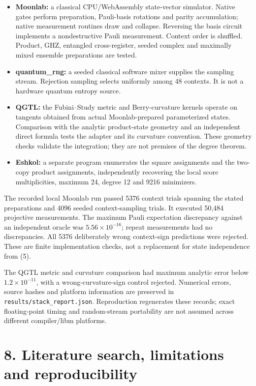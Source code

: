 \documentclass[10pt,a4paper]{article}
\providecommand{\tightlist}{\setlength{\itemsep}{0pt}\setlength{\parskip}{0pt}}
\begin{document}
\begin{itemize}
\tightlist
\item
  \textbf{Moonlab:} a classical CPU/WebAssembly state-vector simulator. Native gates perform preparation, Pauli-basis rotations and parity accumulation; native measurement routines draw and collapse. Reversing the basis circuit implements a nondestructive Pauli measurement. Context order is shuffled. Product, GHZ, entangled cross-register, seeded complex and maximally mixed ensemble preparations are tested.
\item
  \textbf{quantum\_rng:} a seeded classical software mixer supplies the sampling stream. Rejection sampling selects uniformly among 48 contexts. It is not a hardware quantum entropy source.
\item
  \textbf{QGTL:} the Fubini--Study metric and Berry-curvature kernels operate on tangents obtained from actual Moonlab-prepared parameterized states. Comparison with the analytic product-state geometry and an independent direct formula tests the adapter and its curvature convention. These geometry checks validate the integration; they are not premises of the degree theorem.
\item
  \textbf{Eshkol:} a separate program enumerates the square assignments and the two-copy product assignments, independently recovering the local score multiplicities, maximum 24, degree 12 and 9216 minimizers.
\end{itemize}

The recorded local Moonlab run passed 5376 context trials spanning the stated preparations and 4096 seeded context-sampling trials. It executed 50,484 projective measurements. The maximum Pauli expectation discrepancy against an independent oracle was \(5.56\times10^{-16}\); repeat measurements had no discrepancies. All 5376 deliberately wrong context-sign predictions were rejected. These are finite implementation checks, not a replacement for state independence from (5).

The QGTL metric and curvature comparison had maximum analytic error below \(1.2\times10^{-11}\), with a wrong-curvature-sign control rejected. Numerical errors, source hashes and platform information are preserved in \texttt{results/stack\_report.json}. Reproduction regenerates these records; exact floating-point timing and random-stream portability are not assumed across different compiler/libm platforms.

\section{8. Literature search, limitations and reproducibility}\label{literature-search-limitations-and-reproducibility}
\end{document}
